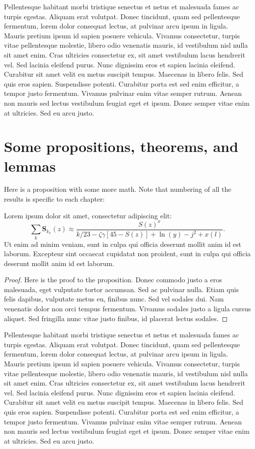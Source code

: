 Pellentesque habitant morbi tristique senectus et netus et malesuada fames ac turpis egestas. Aliquam erat volutpat. Donec tincidunt, quam sed pellentesque fermentum, lorem dolor consequat lectus, at pulvinar arcu ipsum in ligula. Mauris pretium ipsum id sapien posuere vehicula. Vivamus consectetur, turpis vitae pellentesque molestie, libero odio venenatis mauris, id vestibulum nisl nulla sit amet enim. Cras ultricies consectetur ex, sit amet vestibulum lacus hendrerit vel. Sed lacinia eleifend purus. Nunc dignissim eros et sapien lacinia eleifend. Curabitur sit amet velit eu metus suscipit tempus. Maecenas in libero felis. Sed quis eros sapien. Suspendisse potenti. Curabitur porta est sed enim efficitur, a tempor justo fermentum. Vivamus pulvinar enim vitae semper rutrum. Aenean non mauris sed lectus vestibulum feugiat eget et ipsum. Donec semper vitae enim at ultricies. Sed eu arcu justo.

\section{Some propositions, theorems, and lemmas}

Here is a proposition with some more math. Note that numbering of all the results is specific to each chapter:  
\begin{proposition}\label{p:type1}  Lorem ipsum dolor sit amet, consectetur adipiscing elit:
\begin{equation}
\sum_k\bm{S}_{k_x}(z) \approx \frac{S(z)^x}{k / 23 -\zeta\gamma [45- S(z)] + \ln(y) - j^2+x(l)}.
\label{e:type1}\end{equation}
Ut enim ad minim veniam, sunt in culpa qui officia deserunt mollit anim id est laborum. Excepteur sint occaecat cupidatat non proident, sunt in culpa qui officia deserunt mollit anim id est laborum.
\end{proposition}
\begin{proof}
Here is the proof to the proposition. Donec commodo justo a eros malesuada, eget vulputate tortor accumsan. Sed ac pulvinar nulla. Etiam quis felis dapibus, vulputate metus eu, finibus nunc. Sed vel sodales dui. Nam venenatis dolor non orci tempus fermentum. Vivamus sodales justo a ligula cursus aliquet. Sed fringilla nunc vitae justo finibus, id placerat lectus sodales.
\end{proof} 


Pellentesque habitant morbi tristique senectus et netus et malesuada fames ac turpis egestas. Aliquam erat volutpat. Donec tincidunt, quam sed pellentesque fermentum, lorem dolor consequat lectus, at pulvinar arcu ipsum in ligula. Mauris pretium ipsum id sapien posuere vehicula. Vivamus consectetur, turpis vitae pellentesque molestie, libero odio venenatis mauris, id vestibulum nisl nulla sit amet enim. Cras ultricies consectetur ex, sit amet vestibulum lacus hendrerit vel. Sed lacinia eleifend purus. Nunc dignissim eros et sapien lacinia eleifend. Curabitur sit amet velit eu metus suscipit tempus. Maecenas in libero felis. Sed quis eros sapien. Suspendisse potenti. Curabitur porta est sed enim efficitur, a tempor justo fermentum. Vivamus pulvinar enim vitae semper rutrum. Aenean non mauris sed lectus vestibulum feugiat eget et ipsum. Donec semper vitae enim at ultricies. Sed eu arcu justo.

